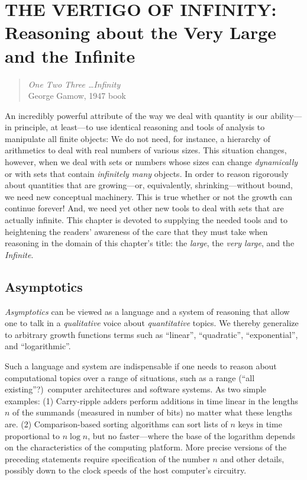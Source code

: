 
\chapter{THE VERTIGO OF INFINITY: \\
Reasoning about the Very Large and the Infinite}
\label{ch:infinity}

\begin{quote}
{\em One Two Three \ldots Infinity} \\
\hspace*{1in}George Gamow, 1947 book
\end{quote}

An incredibly powerful attribute of the way we deal with quantity is
our ability---in principle, at least---to use identical reasoning and
tools of analysis to manipulate all finite objects: We do not need,
for instance, a hierarchy of arithmetics to deal with real numbers of
various sizes.  This situation changes, however, when we deal with
sets or numbers whose sizes can change {\em dynamically} or with sets
that contain {\em infinitely many} objects.  In order to reason
rigorously about quantities that are growing---or, equivalently,
shrinking---without bound, we need new conceptual machinery.  This is
true whether or not the growth can continue forever!  And, we need yet
other new tools to deal with sets that are actually infinite.  This
chapter is devoted to supplying the needed tools and to heightening
the readers' awareness of the care that they must take when reasoning
in the domain of this chapter's title: the {\em large}, the {\em very
  large}, and the {\em Infinite}.



\section{Asymptotics}
\label{sec:asymptotics}

{\em Asymptotics}  can be viewed as a language and
a system of reasoning that allow one to talk in a {\em qualitative}
voice about {\em quantitative} topics.  We thereby generalize to
arbitrary growth functions terms such as ``linear'', ``quadratic'',
``exponential'', and ``logarithmic''.

Such a language and system are indispensable if one needs to reason
about computational topics over a range of situations, such as a range
(``all existing''?)~computer architectures and software systems.  As
two simple examples: (1) Carry-ripple adders perform additions in time
linear in the lengths $n$ of the summands (measured in number of bits)
no matter what these lengths are. (2) Comparison-based sorting
algorithms can sort lists of $n$ keys in time proportional to $n \log
n$, but no faster---where the base of the logarithm depends on the
characteristics of the computing platform.  More precise versions of
the preceding statements require specification of the number $n$ and
other details, possibly down to the clock speeds of the host
computer's circuitry.


